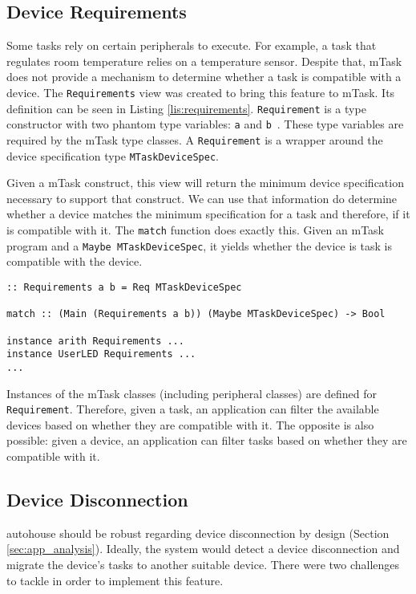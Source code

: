 \subsection{Device Requirements}

Some tasks rely on certain peripherals to execute. For example, a task that regulates room temperature relies on a temperature sensor. Despite that, \gls{mTask} does not provide a mechanism to determine whether a task is compatible with a device. The \texttt{Requirements} view was created to bring this feature to \gls{mTask}. Its definition can be seen in Listing \ref{lis:requirements}. \texttt{Requirement} is a type constructor with two phantom type variables: \texttt{a} and \texttt{b}~\cite{phantom}. These type variables are required by the \gls{mTask} type classes. A \texttt{Requirement} is a wrapper around the device specification type \texttt{MTaskDeviceSpec}. 

Given a \gls{mTask} construct, this view will return the minimum device specification necessary to support that construct. We can use that information do determine whether a device matches the minimum specification for a task and therefore, if it is compatible with it. The \texttt{match} function does exactly this. Given an \gls{mTask} program and a \texttt{Maybe MTaskDeviceSpec}, it yields whether the device is task is compatible with the device.

\begin{lstlisting}[caption=The \texttt{Requirements} view,captionpos=b,label=lis:requirements]
:: Requirements a b = Req MTaskDeviceSpec

match :: (Main (Requirements a b)) (Maybe MTaskDeviceSpec) -> Bool

instance arith Requirements ...
instance UserLED Requirements ...
...
\end{lstlisting}

Instances of the \gls{mTask} classes (including peripheral classes) are defined for \texttt{Requirement}. Therefore, given a task, an application can filter the available devices based on whether they are compatible with it. The opposite is also possible: given a device, an application can filter tasks based on whether they are compatible with it.

\subsection{Device Disconnection}

\gls{autohouse} should be robust regarding device disconnection by design (Section \ref{sec:app_analysis}). Ideally, the system would detect a device disconnection and migrate the device's tasks to another suitable device. There were two challenges to tackle in order to implement this feature. 

